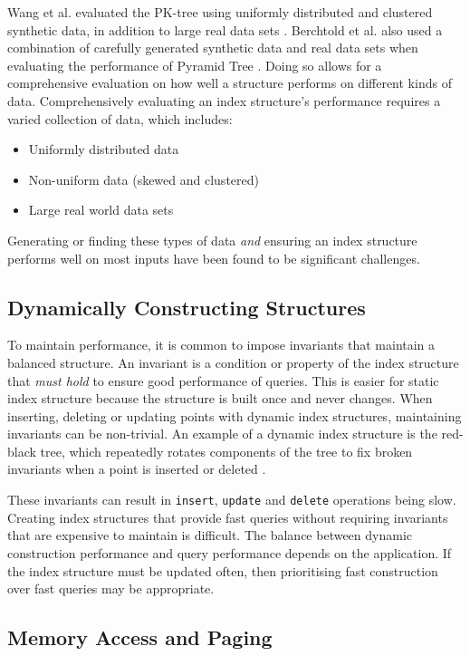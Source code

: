 Wang et al. evaluated the PK-tree using uniformly distributed and clustered synthetic data, in addition to large real data sets \cite{pk-tree}. Berchtold et al. also used a combination of carefully generated synthetic data and real data sets when evaluating the performance of Pyramid Tree \cite{pyramid-tree}. Doing so allows for a comprehensive evaluation on how well a structure performs on different kinds of data.  Comprehensively evaluating an index structure's performance requires a varied collection of data, which includes:
\begin{itemize}
	\item Uniformly distributed data
	\item Non-uniform data (skewed and clustered)
	\item Large real world data sets
\end{itemize}	
Generating or finding these types of data \textit{and} ensuring an index structure performs well on most inputs have been found to be significant challenges.

\subsection{Dynamically Constructing Structures}

To maintain performance, it is common to impose invariants that maintain a balanced structure. An invariant is a condition or property of the index structure that \textit{must hold} to ensure good performance of queries. This is easier for static index structure because the structure is built once and never changes. When inserting, deleting or updating points with dynamic index structures, maintaining invariants can be non-trivial. An example of a dynamic index structure is the red-black tree, which repeatedly rotates components of the tree to fix broken invariants when a point is inserted or deleted \cite{introduction-to-algorithms}.

These invariants can result in \texttt{insert}, \texttt{update} and \texttt{delete} operations being slow. Creating index structures that provide fast queries without requiring invariants that are expensive to maintain is difficult. The balance between dynamic construction performance and query performance depends on the application. If the index structure must be updated often, then prioritising fast construction over fast queries may be appropriate.

\subsection{Memory Access and Paging}
\label{sec:paging}


